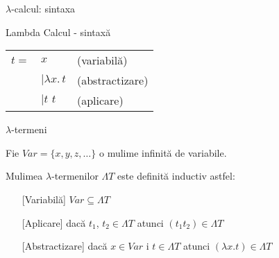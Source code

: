 \documentclass[xcolor=pdftex,romanian,colorlinks]{beamer}
\begin{document}
\begin{frame}[fragile]{ $\lambda$-calcul: sintaxa}

\begin{block}{Lambda Calcul - sintaxă}
\begin{center}
 \begin{tabular}{lll}
$t=$ &  $x$ &  (variabilă) \\
 & $\mid \lambda x.\, t$ & (abstractizare)\\
  & $\mid t\,\, t$ & (aplicare)
\end{tabular}
\end{center}
\end{block}

\pause

\begin{block}{$\lambda$-termeni}

Fie $Var=\{x,y,z,\ldots\}$ o mul\ts ime infinit\u a de variabile.

Mul\ts imea  $\lambda$-termenilor $\Lambda T$ este definit\u a inductiv astfel:
\begin{center}
\begin{itemize}
\item[][Variabil\u a] $Var\subseteq \Lambda T$
\item[][Aplicare] dac\u a $t_1$, $t_2\in \Lambda T$ atunci 
$(t_1t_2)\in \Lambda T$
\item[][Abstractizare] dac\u a $x\in Var$ \sh i $t\in \Lambda T$ atunci
$(\lambda x.t)\in \Lambda T$
\end{itemize} 
\end{center}
\end{block}
\end{frame}
\end{document}
